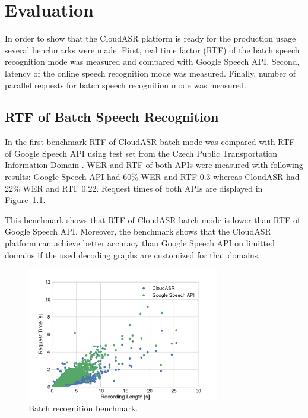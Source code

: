 \chapter{Evaluation}\label{chapter:evaluation}
In order to show that the CloudASR platform is ready for the production usage
  several benchmarks were made.
First, real time factor (RTF) of the batch speech recognition mode was measured and compared with Google Speech API.
Second, latency of the online speech recognition mode was measured.
Finally, number of parallel requests for batch speech recognition mode was measured.


\section{RTF of Batch Speech Recognition}
In the first benchmark RTF of CloudASR batch mode was compared with RTF of Google Speech API
  using test set from the Czech Public Transportation Information Domain \cite{korvas2014vystadial}.
WER and RTF of both APIs were measured with following results:
Google Speech API had 60\% WER and RTF 0.3 whereas
  CloudASR had 22\% WER and RTF 0.22.
Request times of both APIs are displayed in Figure~\ref{fig:batch-benchmark}.

This benchmark shows that RTF of CloudASR batch mode is lower than RTF of Google Speech API.
Moreover, the benchmark shows that the CloudASR platform can achieve better accuracy than Google Speech API on limitted domains
  if the used decoding graphs are customized for that domains.


\begin{figure}[h]
  \centering
  \includegraphics[width=0.75\textwidth]{./img/batch.pdf}

  \caption{
    Batch recognition benchmark.
  }
  \label{fig:batch-benchmark}
\end{figure}



